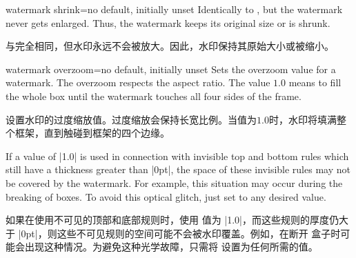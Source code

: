
\begin{docTcbKey}{watermark shrink}{=}{no default, initially unset}
Identically to , but the watermark
never gets enlarged. Thus, the watermark keeps its original size or is shrunk.

与完全相同，但水印永远不会被放大。因此，水印保持其原始大小或被缩小。
\end{docTcbKey}


\begin{docTcbKey}{watermark overzoom}{=}{no default, initially unset}
Sets the overzoom value for a watermark. The overzoom respects the aspect ratio.
The value $1.0$ means to fill the whole box until the watermark touches
all four sides of the frame.

设置水印的过度缩放值。过度缩放会保持长宽比例。当值为$1.0$时，水印将填满整个框架，直到触碰到框架的四个边缘。
\begin{dispExample}

\begin{tcolorbox}[title=Zoom 1.0,watermark zoom=1.0]
\lipsum[1]
\end{tcolorbox}\hfill%
\begin{tcolorbox}[title=Overzoom 1.0,watermark overzoom=1.0]
\lipsum[1]
\end{tcolorbox}%
\end{dispExample}
\end{docTcbKey}

\begin{marker}
If a  value of |1.0| is used in connection
with invisible top and bottom rules which still have a thickness greater than |0pt|,
the space of these invisible rules may not be covered by the watermark.
For example, this situation may occur during the breaking of  boxes.
To avoid this optical glitch, just set  to any desired value.

如果在使用不可见的顶部和底部规则时，使用  值为 |1.0|，而这些规则的厚度仍大于 |0pt|，则这些不可见规则的空间可能不会被水印覆盖。例如，在断开  盒子时可能会出现这种情况。为避免这种光学故障，只需将  设置为任何所需的值。
\end{marker}

